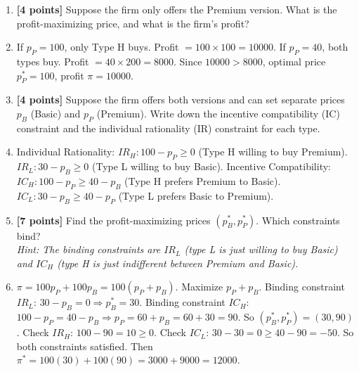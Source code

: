 \documentclass[11pt]{article}
\begin{document}
\begin{enumerate}[label=(\alph*)]
    \item \textbf{[4 points]} Suppose the firm only offers the Premium version. What is the profit-maximizing price, and what is the firm's profit?
    \item[] If $p_P=100$, only Type H buys. Profit $=100\times100=10000$. If $p_P=40$, both types buy. Profit $=40\times200=8000$. Since $10000>8000$, optimal price $p_P^*=100$, profit $\pi=10000$.
    
    \item \textbf{[4 points]} Suppose the firm offers both versions and can set separate prices $p_B$ (Basic) and $p_P$ (Premium). Write down the incentive compatibility (IC) constraint and the individual rationality (IR) constraint for each type.
    \item[] Individual Rationality: $IR_H: 100-p_P\geq0$ (Type H willing to buy Premium). $IR_L: 30-p_B\geq0$ (Type L willing to buy Basic). Incentive Compatibility: $IC_H: 100-p_P\geq40-p_B$ (Type H prefers Premium to Basic). $IC_L: 30-p_B\geq40-p_P$ (Type L prefers Basic to Premium).
    
    \item \textbf{[7 points]} Find the profit-maximizing prices $(p_B^*, p_P^*)$. Which constraints bind?\\
    \textit{Hint: The binding constraints are $IR_L$ (type L is just willing to buy Basic) and $IC_H$ (type H is just indifferent between Premium and Basic).}
    \item[] $\pi=100p_P+100p_B=100(p_P+p_B)$. Maximize $p_P+p_B$. Binding constraint $IR_L$: $30-p_B=0\Rightarrow p_B^*=30$. Binding constraint $IC_H$: $100-p_P=40-p_B\Rightarrow p_P=60+p_B=60+30=90$. So $(p_B^*,p_P^*)=(30,90)$. Check $IR_H$: $100-90=10\geq0$. Check $IC_L$: $30-30=0\geq40-90=-50$. So both constraints satisfied. Then $\pi^*=100(30)+100(90)=3000+9000=12000$.
    

\end{enumerate}
\end{document}
